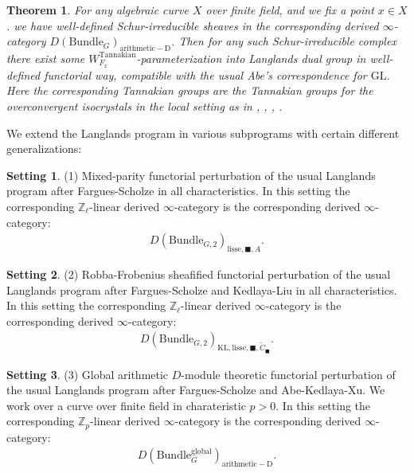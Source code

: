 \documentclass[12pt]{book}
\newtheorem{theorem}{Theorem}
\theoremstyle{definition}
\newtheorem{setting}{Setting}
\begin{document}
\begin{theorem}
For any algebraic curve $X$ over finite field, and we fix a point $x\in X$. we have well-defined Schur-irreducible sheaves in the corresponding derived $\infty$-category $D(\mathrm{Bundle}_{G})_{\mathrm{arithmetic-D}}$. Then for any such Schur-irreducible complex there exist some $W^\mathrm{Tannakian}_{F_x}$-parameterization into Langlands dual group in well-defined functorial way, compatible with the usual Abe's correspondence for $\mathrm{GL}$. Here the corresponding Tannakian groups are the Tannakian groups for the overconvergent isocrystals in the local setting as in \cite{AI}, \cite{KI}, \cite{KXII}, \cite{DK}.
\end{theorem}







We extend the Langlands program in various subprograms with certain different generalizations: 
\begin{setting}
(1) Mixed-parity functorial perturbation of the usual Langlands program after Fargues-Scholze in all characteristics. In this setting the corresponding $\mathbb{Z}_\ell$-linear derived $\infty$-category is the corresponding derived $\infty$-category:
\begin{align}
D(\mathrm{Bundle}_{G,2})_{\text{lisse},\blacksquare,A}.
\end{align}




\end{setting}


\begin{setting}
(2) Robba-Frobenius sheafified functorial perturbation of the usual Langlands program after Fargues-Scholze and Kedlaya-Liu in all characteristics. In this setting the corresponding $\mathbb{Z}_\ell$-linear derived $\infty$-category is the corresponding derived $\infty$-category:
\begin{align}
D(\mathrm{Bundle}_{G,2})_{\text{KL},\mathrm{lisse},\blacksquare,\widetilde{C}_\blacksquare}.
\end{align}



\end{setting}

\begin{setting}
(3) Global arithmetic $D$-module theoretic functorial perturbation of the usual Langlands program after Fargues-Scholze and Abe-Kedlaya-Xu. We work over a curve over finite field in charateristic $p>0$. In this setting the corresponding $\mathbb{Z}_p$-linear derived $\infty$-category is the corresponding derived $\infty$-category:
\begin{align}
D(\mathrm{Bundle}^\mathrm{global}_{G})_{\mathrm{arithmetic-D}}.
\end{align}
 
\end{setting}
\end{document}
